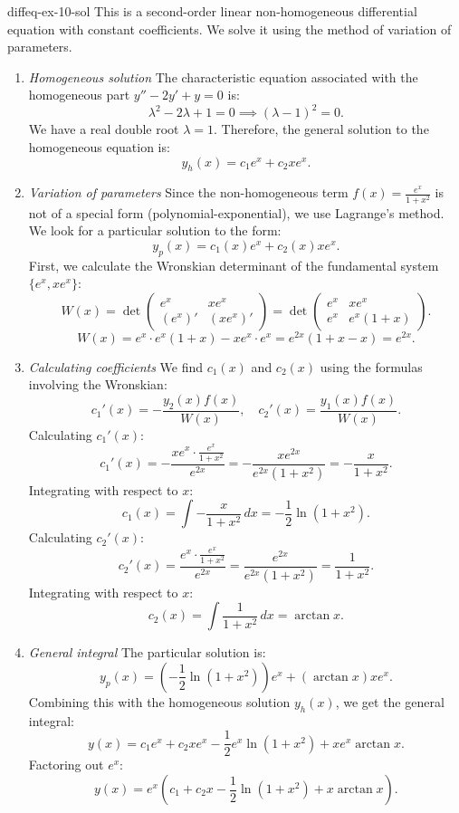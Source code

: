 \documentclass[preview]{standalone}
\begin{document}
\begin{snippetsolution}{diffeq-ex-10-sol}{}
    This is a second-order linear non-homogeneous differential equation with constant coefficients. We solve it using the method of variation of parameters.
    \begin{enumerate}
        \item \emph{Homogeneous solution}
        The characteristic equation associated with the homogeneous part \( y'' - 2y' + y = 0 \) is:
        \[ \lambda^2 - 2\lambda + 1 = 0 \implies (\lambda - 1)^2 = 0. \]
        We have a real double root \( \lambda = 1 \).
        Therefore, the general solution to the homogeneous equation is:
        \[ y_h(x) = c_1 e^x + c_2 x e^x. \]
        \item \emph{Variation of parameters}
        Since the non-homogeneous term \( f(x) = \frac{e^x}{1+x^2} \) is not of a special form (polynomial-exponential), we use Lagrange's method. We look for a particular solution to the form:
        \[ y_p(x) = c_1(x)e^x + c_2(x)xe^x. \]
        First, we calculate the Wronskian determinant of the fundamental system \( \{e^x, xe^x\} \):
        \[ W(x) = \det \begin{pmatrix} e^x & xe^x \\ (e^x)' & (xe^x)' \end{pmatrix} = \det \begin{pmatrix} e^x & xe^x \\ e^x & e^x(1+x) \end{pmatrix}. \]
        \[ W(x) = e^x \cdot e^x(1+x) - xe^x \cdot e^x = e^{2x}(1+x-x) = e^{2x}. \]
        \item \emph{Calculating coefficients}
        We find \( c_1(x) \) and \( c_2(x) \) using the formulas involving the Wronskian:
        \[ c_1'(x) = -\frac{y_2(x) f(x)}{W(x)}, \quad c_2'(x) = \frac{y_1(x) f(x)}{W(x)}. \]
        Calculating \( c_1'(x) \):
        \[ c_1'(x) = -\frac{xe^x \cdot \frac{e^x}{1+x^2}}{e^{2x}} = -\frac{xe^{2x}}{e^{2x}(1+x^2)} = -\frac{x}{1+x^2}. \]
        Integrating with respect to \( x \):
        \[ c_1(x) = \int -\frac{x}{1+x^2} \, dx = -\frac{1}{2} \ln(1+x^2). \]
        Calculating \( c_2'(x) \):
        \[ c_2'(x) = \frac{e^x \cdot \frac{e^x}{1+x^2}}{e^{2x}} = \frac{e^{2x}}{e^{2x}(1+x^2)} = \frac{1}{1+x^2}. \]
        Integrating with respect to \( x \):
        \[ c_2(x) = \int \frac{1}{1+x^2} \, dx = \arctan x. \]
        \item \emph{General integral}
        The particular solution is:
        \[ y_p(x) = \left(-\frac{1}{2} \ln(1+x^2)\right)e^x + (\arctan x)xe^x. \]
        Combining this with the homogeneous solution \( y_h(x) \), we get the general integral:
        \[ y(x) = c_1 e^x + c_2 x e^x - \frac{1}{2} e^x \ln(1+x^2) + x e^x \arctan x. \]
        Factoring out \( e^x \):
        \[ y(x) = e^x \left( c_1 + c_2 x - \frac{1}{2} \ln(1+x^2) + x \arctan x \right). \]
    \end{enumerate}
\end{snippetsolution}
\end{document}
